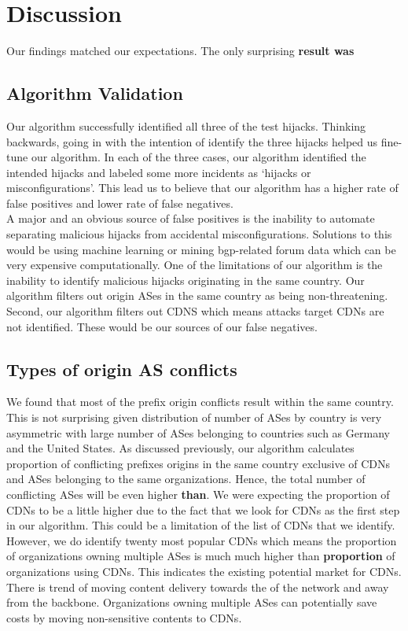 \section{Discussion}\label{sec:discussion}
Our findings matched our expectations. The only surprising \textbf{result was }
\subsection{Algorithm Validation}
Our algorithm successfully identified all three of the test hijacks. Thinking backwards, going in with the intention of identify the three hijacks helped us fine-tune our algorithm. In each of the three cases, our algorithm identified the intended hijacks and labeled some more incidents as `hijacks or misconfigurations'. This lead us to believe that our algorithm has a higher rate of false positives and lower rate of false negatives.\\
A major and an obvious source of false positives is the inability to automate separating malicious hijacks from accidental misconfigurations. Solutions to this would be using machine learning or mining bgp-related forum data which can be very expensive computationally. One of the limitations of our algorithm is the inability to identify malicious hijacks originating in the same country. Our algorithm filters out origin ASes in the same country as being non-threatening. Second, our algorithm filters out CDNS which means attacks target CDNs are not identified. These would be our sources of our false negatives. 
\subsection{Types of origin AS conflicts}
We found that most of the prefix origin conflicts result within the same country. This is not surprising given distribution of number of ASes by country is very asymmetric with large number of ASes belonging to countries such as Germany and the United States. As discussed previously, our algorithm calculates proportion of conflicting prefixes origins in the same country exclusive of CDNs and ASes belonging to the same organizations. Hence, the total number of conflicting ASes will be even higher \textbf{than}. 
We were expecting the proportion of CDNs to be a little higher due to the fact that we look for CDNs as the first step in our algorithm. This could be a limitation of the list of CDNs that we identify. However, we do identify twenty most popular CDNs which means the proportion of organizations owning multiple ASes is much much higher than \textbf{proportion} of organizations using CDNs. This indicates the existing potential market for CDNs. There is trend of moving content delivery towards the of the network and away from the backbone. Organizations owning multiple ASes can potentially save costs by moving non-sensitive contents to CDNs.
